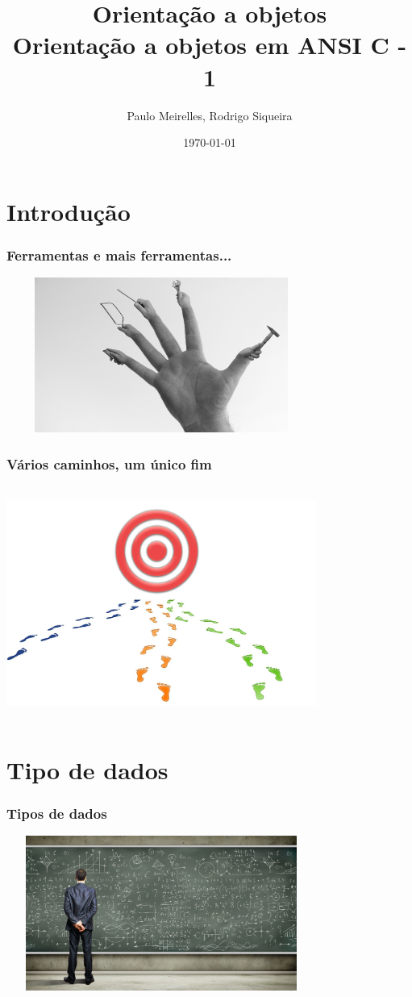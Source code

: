 \documentclass{beamer}
\title{Orientação a objetos\\ \textbf{Orientação a objetos em ANSI C - 1}}
\author{Paulo Meirelles, Rodrigo Siqueira}
\date{\today}
\institute{\textbf{Universidade de Brasília - Faculdade do Gama}}
\begin{document}
\begin{frame}
  \titlepage
\end{frame}
  
\section{Introdução}
\begin{frame}
  \frametitle{Ferramentas e mais ferramentas...}
  \includegraphics[height = 2in, width = 4in]{image/tools.jpeg}
\end{frame}

\begin{frame}
  \frametitle{Vários caminhos, um único fim}
  \includegraphics[height = 3in, width = 4in]{image/many_paths.jpg}
\end{frame}

\section{Tipo de dados}

\begin{frame}
  \frametitle{Tipos de dados}
  \includegraphics[height = 2in, width = 4in]{image/many_data.jpeg}
\end{frame}
\end{document}
